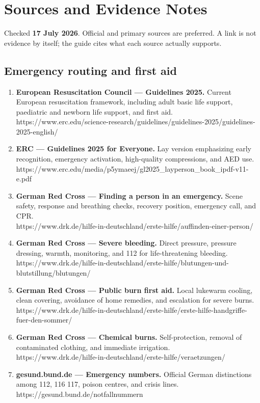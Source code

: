 \hypertarget{10-sources}{}
\hypertarget{sources-and-evidence-notes}{%
\section{Sources and Evidence Notes}\label{sources-and-evidence-notes}}

Checked \textbf{17 July 2026}. Official and primary sources are
preferred. A link is not evidence by itself; the guide cites what each
source actually supports.

\hypertarget{emergency-routing-and-first-aid}{%
\subsection{Emergency routing and first
aid}\label{emergency-routing-and-first-aid}}

\begin{enumerate}
\def\labelenumi{\arabic{enumi}.}
\item
  \textbf{European Resuscitation Council --- Guidelines 2025.} Current
  European resuscitation framework, including adult basic life support,
  paediatric and newborn life support, and first aid.\\
  https://www.erc.edu/science-research/guidelines/guidelines-2025/guidelines-2025-english/
\item
  \textbf{ERC --- Guidelines 2025 for Everyone.} Lay version emphasizing
  early recognition, emergency activation, high-quality compressions,
  and AED use.\\
  https://www.erc.edu/media/p5ymaeej/gl2025\_layperson\_book\_ipdf-v11-e.pdf
\item
  \textbf{German Red Cross --- Finding a person in an emergency.} Scene
  safety, response and breathing checks, recovery position, emergency
  call, and CPR.\\
  https://www.drk.de/hilfe-in-deutschland/erste-hilfe/auffinden-einer-person/
\item
  \textbf{German Red Cross --- Severe bleeding.} Direct pressure,
  pressure dressing, warmth, monitoring, and 112 for life-threatening
  bleeding.\\
  https://www.drk.de/hilfe-in-deutschland/erste-hilfe/blutungen-und-blutstillung/blutungen/
\item
  \textbf{German Red Cross --- Public burn first aid.} Local lukewarm
  cooling, clean covering, avoidance of home remedies, and escalation
  for severe burns.\\
  https://www.drk.de/hilfe-in-deutschland/erste-hilfe/erste-hilfe-handgriffe-fuer-den-sommer/
\item
  \textbf{German Red Cross --- Chemical burns.} Self-protection, removal
  of contaminated clothing, and immediate irrigation.\\
  https://www.drk.de/hilfe-in-deutschland/erste-hilfe/veraetzungen/
\item
  \textbf{gesund.bund.de --- Emergency numbers.} Official German
  distinctions among 112, 116 117, poison centres, and crisis lines.\\
  https://gesund.bund.de/notfallnummern
\end{enumerate}

